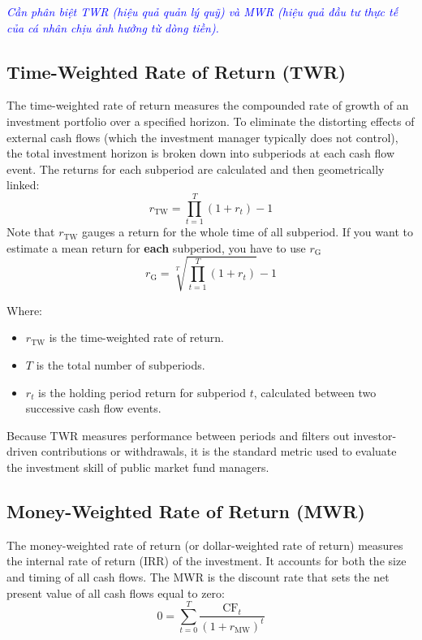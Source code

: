 \textcolor{blue}{\textit{Cần phân biệt TWR (hiệu quả quản lý quỹ) và MWR (hiệu quả đầu tư thực tế của cá nhân chịu ảnh hưởng từ dòng tiền).}}

\subsection{Time-Weighted Rate of Return (TWR)}
	\label{subsec:Time-Weighted Rate of Return (TWR)}
The time-weighted rate of return measures the compounded rate of growth of an investment portfolio over a specified horizon. To eliminate the distorting effects of external cash flows (which the investment manager typically does not control), the total investment horizon is broken down into subperiods at each cash flow event. The returns for each subperiod are calculated and then geometrically linked:
\begin{equation}
	r_{\text{TW}} = \prod_{t=1}^{T} (1 + r_t) - 1
	\label{eq:twr_m3}
\end{equation}
Note that $r_{\text{TW}}$ gauges a return for the whole time of all subperiod. 
If you want to estimate a mean return for \textbf{each} subperiod, you have to use $r_{\text{G}}$ 
\begin{equation}
	r_{\text{G}} = \sqrt[T]{\prod_{t=1}^{T} (1 + r_t)} - 1
	\label{eq:twr_G}
\end{equation}

Where:
\begin{itemize}
	\item[] $r_{\text{TW}}$ is the time-weighted rate of return.
	\item[] $T$ is the total number of subperiods.
	\item[] $r_t$ is the holding period return for subperiod $t$, calculated between two successive cash flow events.
\end{itemize}

Because TWR measures performance between periods and filters out investor-driven contributions or withdrawals, it is the standard metric used to evaluate the investment skill of public market fund managers.

\subsection{Money-Weighted Rate of Return (MWR)}
	\label{subsec:Money-Weighted Rate of Return (MWR)}
The money-weighted rate of return (or dollar-weighted rate of return) measures the internal rate of return (IRR) of the investment. It accounts for both the size and timing of all cash flows. The MWR is the discount rate that sets the net present value of all cash flows equal to zero:
\begin{equation}
	0 = \sum_{t=0}^{T} \frac{\text{CF}_t}{(1 + r_{\text{MW}})^t}
	\label{eq:mwr_m3}
\end{equation}

